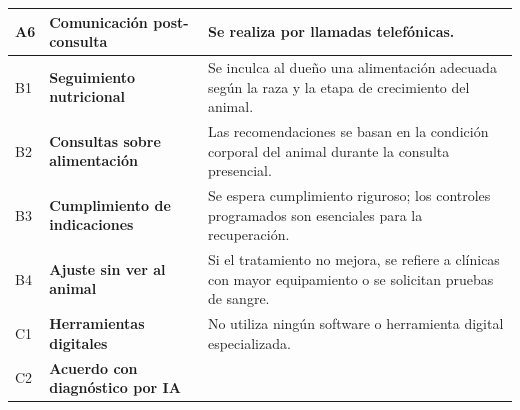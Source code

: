 \documentclass[
]{article}
\newcounter{none} %
\begin{document}
{\def\LTcaptype{none} %
\begin{longtable}[]{|
  >{\centering\arraybackslash}p{}|
  >{\raggedright\arraybackslash}p{}|
  >{\raggedright\arraybackslash}p{}|}
\hline
\begin{minipage}[b]{\linewidth}\centering
A6
\end{minipage} & \begin{minipage}[b]{\linewidth}\raggedright
\textbf{Comunicación post-consulta}
\end{minipage} & \begin{minipage}[b]{\linewidth}\raggedright
Se realiza por llamadas telefónicas.
\end{minipage} \\
\hline
\endhead
\hline
\endlastfoot
B1 & \textbf{Seguimiento nutricional} &
\begin{minipage}[t]{\linewidth}\raggedright
Se inculca al dueño una alimentación adecuada según la raza y la etapa
de crecimiento del animal.
\end{minipage} \\
\hline
B2 & \textbf{Consultas sobre alimentación} &
\begin{minipage}[t]{\linewidth}\raggedright
Las recomendaciones se basan en la condición corporal del animal durante
la consulta presencial.
\end{minipage} \\
\hline
B3 & \textbf{Cumplimiento de indicaciones} &
\begin{minipage}[t]{\linewidth}\raggedright
Se espera cumplimiento riguroso; los controles programados son
esenciales para la recuperación.
\end{minipage} \\
\hline
B4 & \textbf{Ajuste sin ver al animal} &
\begin{minipage}[t]{\linewidth}\raggedright
Si el tratamiento no mejora, se refiere a clínicas con mayor
equipamiento o se solicitan pruebas de sangre.
\end{minipage} \\
\hline
C1 & \textbf{Herramientas digitales} &
\begin{minipage}[t]{\linewidth}\raggedright
No utiliza ningún software o herramienta digital especializada.
\end{minipage} \\
\hline
C2 & \textbf{Acuerdo con diagnóstico por IA} &
\begin{minipage}[t]{\linewidth}\raggedright

\end{minipage}
\end{longtable}}
\end{document}
